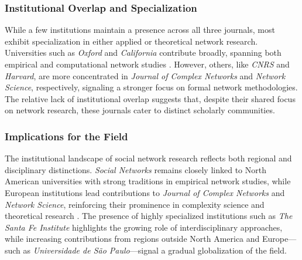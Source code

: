 \documentclass[twocolumn]{article}
\begin{document}
	\subsubsection*{Institutional Overlap and Specialization}
	
	While a few institutions maintain a presence across all three journals, most exhibit specialization in either applied or theoretical network research. Universities such as \textit{Oxford} and \textit{California} contribute broadly, spanning both empirical and computational network studies \cite{Strogatz2001}. However, others, like \textit{CNRS} and \textit{Harvard}, are more concentrated in \textit{Journal of Complex Networks} and \textit{Network Science}, respectively, signaling a stronger focus on formal network methodologies. The relative lack of institutional overlap suggests that, despite their shared focus on network research, these journals cater to distinct scholarly communities.
	
	\subsubsection*{Implications for the Field}
	
	The institutional landscape of social network research reflects both regional and disciplinary distinctions. \textit{Social Networks} remains closely linked to North American universities with strong traditions in empirical network studies, while European institutions lead contributions to \textit{Journal of Complex Networks} and \textit{Network Science}, reinforcing their prominence in complexity science and theoretical research \cite{Watts1998}. The presence of highly specialized institutions such as \textit{The Santa Fe Institute} highlights the growing role of interdisciplinary approaches, while increasing contributions from regions outside North America and Europe—such as \textit{Universidade de São Paulo}—signal a gradual globalization of the field.
	
	
	
\end{document}
